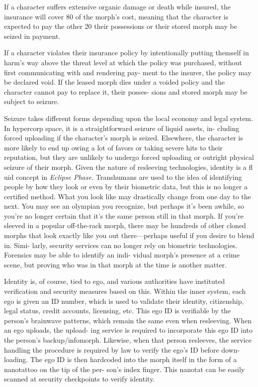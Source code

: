 If a character suffers extensive organic damage or 
death while insured, the insurance will cover 80%
of the morph's cost, meaning that the character is 
expected to pay the other 20%
their possessions or their stored morph may be 
seized in payment.

If a character violates their insurance policy by 
intentionally putting themself in harm's way above 
the threat level at which the policy was purchased, 
without first communicating with and rendering pay-
ment to the insurer, the policy may be declared void. 
If the leased morph dies under a voided policy and 
the character cannot pay to replace it, their posses-
sions and stored morph may be subject to seizure.

Seizure takes different forms depending upon the 
local economy and legal system. In hypercorp space, 
it is a straightforward seizure of liquid assets, in-
cluding forced uploading if the character's morph is 
seized. Elsewhere, the character is more likely to end 
up owing a lot of favors or taking severe hits to their 
reputation, but they are unlikely to undergo forced 
uploading or outright physical seizure of their morph.
Given the nature of resleeving technologies, identity 
is a fl uid concept in \textit{Eclipse Phase.} Transhumans are 
used to the idea of identifying people by how they 
look or even by their biometric data, but this is no 
longer a certified method. What you look like may 
drastically change from one day to the next. You 
may see an olympian you recognize, but perhaps it's 
been awhile, so you're no longer certain that it's the 
same person still in that morph. If you're sleeved in a 
popular off-the-rack morph, there may be hundreds 
of other cloned morphs that look exactly like you out 
there—perhaps useful if you desire to blend in. Simi-
larly, security services can no longer rely on biometric 
technologies. Forensics may be able to identify an indi-
vidual morph's presence at a crime scene, but proving 
who was in that morph at the time is another matter.

Identity is, of course, tied to ego, and various 
authorities have instituted verification and security 
measures based on this. Within the inner system, each 
ego is given an ID number, which is used to validate 
their identity, citizenship, legal status, credit accounts, 
licensing, etc. This ego ID is verifiable by the person's 
brainwave patterns, which remain the same even 
when resleeving. When an ego uploads, the upload-
ing service is required to incorporate this ego ID into 
the person's backup/infomorph. Likewise, when that 
person resleeves, the service handling the procedure 
is required by law to verify the ego's ID before down-
loading. The ego ID is then hardcoded into the morph 
itself in the form of a nanotattoo on the tip of the per-
son's index finger. This nanotat can be easily scanned 
at security checkpoints to verify identity.

